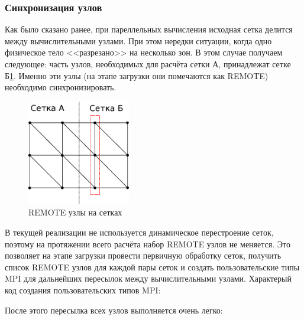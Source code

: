 \subsubsection{Синхронизация узлов}
Как было сказано ранее, при пареллельных вычисления исходная сетка делится между вычислительными узлами. При этом нередки ситуации, когда одно физическое тело <<разрезано>> на несколько зон. В этом случае получаем следующее: часть узлов, необходимых для расчёта сетки А, принадлежат сетке Б\ref{pic:remote_nodes}. Именно эти узлы (на этапе загрузки они помечаются как REMOTE) необходимо синхронизировать.
\begin{figure}[htp]
\centering
\includegraphics[width=0.4\textwidth]{eps/remote_nodes.eps}
\caption{REMOTE узлы на сетках}
\label{pic:remote_nodes}
\end{figure}
В текущей реализации не используется динамическое перестроение сеток, поэтому на протяжении всего расчёта набор REMOTE узлов не меняется. Это позволяет на этапе загрузки провести первичную обработку сеток, получить список REMOTE узлов для каждой пары сеток и создать пользовательские типы MPI для дальнейших пересылок между вычислительными узлами. Характерый код создания пользовательских типов MPI:

После этого пересылка всех узлов выполняется очень легко:

